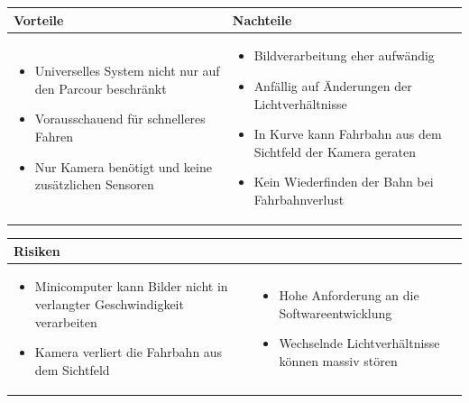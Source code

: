 \begin{table}[h]
\begin{tabular}{p{} | p{}}


 \textbf{Vorteile} & \textbf{Nachteile} \\ \hline
	 
\begin{itemize}
\item Universelles System nicht nur auf den Parcour beschränkt
\item Vorausschauend für schnelleres Fahren
\item Nur Kamera benötigt und keine zusätzlichen Sensoren
\end{itemize}

 
 &
 
\begin{itemize}
\item Bildverarbeitung eher aufwändig
\item Anfällig auf Änderungen der Lichtverhältnisse
\item In Kurve kann Fahrbahn aus dem Sichtfeld der Kamera geraten
\item Kein Wiederfinden der Bahn bei Fahrbahnverlust
\end{itemize}

\end{tabular}
\end{table}

\begin{table}[h]
\begin{tabular}{p{}p{}}


 \textbf{Risiken} & \\ \hline
	 
\begin{itemize}
\item Minicomputer kann Bilder nicht in verlangter Geschwindigkeit verarbeiten
\item Kamera verliert die Fahrbahn aus dem Sichtfeld
\end{itemize}
&
\begin{itemize}
\item Hohe Anforderung an die Softwareentwicklung
\item Wechselnde Lichtverhältnisse können massiv stören
\end{itemize}

 
\end{tabular}
\end{table}

\pagebreak